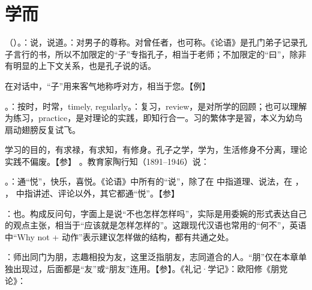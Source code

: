 \chapter{学而}

{
\item {}（）。：说，说道。：对男子的尊称。对曾任者，也可称。《论语》是孔门弟子记录孔子言行的书，所以不加限定的“子”专指孔子，相当于老师；不加限定的“曰”，除非有明显的上下文关系，也是孔子说的话。

在对话中，“子”用来客气地称呼对方，相当于您。【例】 
\item {}。：按时，时常，timely, regularly。：复习，review，是对所学的回顾；也可以理解为练习，practice，是对理论的实践，即知行合一。习的繁体字是習，本义为幼鸟扇动翅膀反复试飞。 %

学习的目的，有求禄，有求知，有修身。孔子之学，学为，生活修身不分离，理论实践不偏废。【参】    。教育家陶行知（1891--1946）说：

\item {}。：通“悦”，快乐，喜悦。《论语》中所有的“说”，除了在  中指道理、说法，在  ， ， 中指讲述、评论以外，其它都通“悦”。【参】

：也。构成反问句，字面上是说“不也怎样怎样吗”，实际是用委婉的形式表达自己的观点主张，相当于“应该就是怎样怎样的”。这跟现代汉语也常用的“何不”，英语中“Why not + 动作”表示建议怎样做的结构，都有共通之处。
\item {}：师出同门为朋，志趣相投为友，这里泛指朋友，志同道合的人。“朋”仅在本章单独出现过，后面都是“友”或“朋友”连用。【参】。《礼记·学记》：欧阳修《朋党论》：

}
